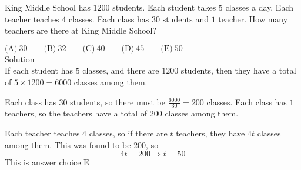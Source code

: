

King Middle School has $1200$ students. Each student takes $5$ classes a day. Each teacher teaches $4$ classes. Each class has $30$ students and $1$ teacher. How many teachers are there at King Middle School?

$\text{(A)}\ 30 \qquad \text{(B)}\ 32 \qquad \text{(C)}\ 40 \qquad \text{(D)}\ 45 \qquad \text{(E)}\ 50$
\\
Solution
\\
If each student has $5$ classes, and there are $1200$ students, then they have a total of $5\times 1200=6000$ classes among them.

Each class has $30$ students, so there must be $\frac{6000}{30}=200$ classes. Each class has $1$ teachers, so the teachers have a total of $200$ classes among them.

Each teacher teaches $4$ classes, so if there are $t$ teachers, they have $4t$ classes among them. This was found to be $200$, so \[4t=200\Rightarrow t=50\]
This is answer choice $\boxed{\text{E}}$
